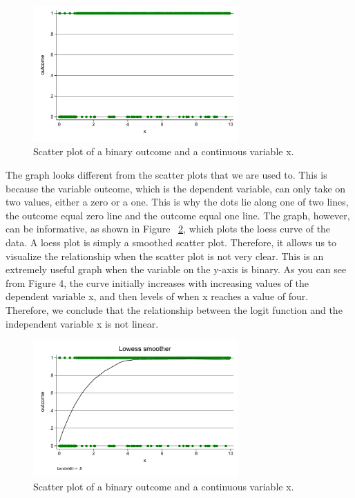 \documentclass[a4paper,12pt,oneside]{book}
\begin{document}
\begin{stlog}\end{stlog}
\begin{figure}[h]
    \centering
    \includegraphics[width=0.7\textwidth]{book_1.pdf}
    \caption{Scatter plot of a binary outcome and a continuous variable x.}
    \label{fig:scatterlinear}
\end{figure}

The graph looks different from the scatter plots that we are used to. This is because the variable outcome, which is the dependent variable, can only take on two values, either a zero or a one. This is why the dots lie 
along one of two lines, the outcome equal zero line and the outcome equal one line. The graph, however, can be informative, as shown in Figure ~\ref{fig:scatterlowess}, which plots the loess curve of the data. A loess plot is simply a smoothed 
scatter plot. Therefore, it allows us to visualize the relationship when the scatter plot is not very clear. This is an extremely useful graph when the variable on the y-axis is binary. As you can see from Figure 4, the 
curve initially increases with increasing values of the dependent variable x, and then levels of when x reaches a value of four. Therefore, we conclude that the relationship between the logit function and the independent 
variable x is not linear.

\begin{stlog}\end{stlog}
\begin{figure}[h]
    \centering
    \includegraphics[width=0.7\textwidth]{book_2.pdf}
    \caption{Scatter plot of a binary outcome and a continuous variable x.}
    \label{fig:scatterlowess}
\end{figure}
\end{document}
